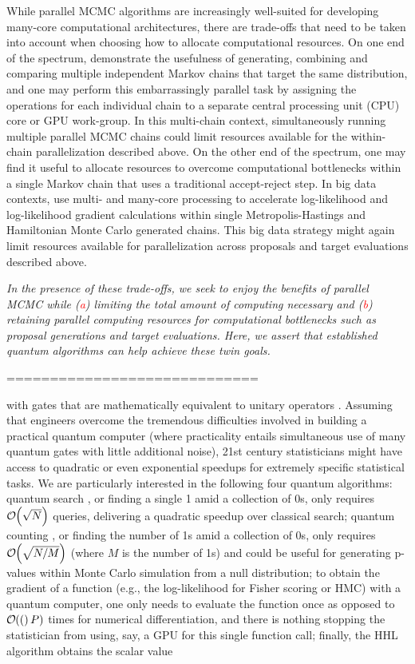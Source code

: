 \documentclass[12pt]{article} %
\newcommand{\order}[1]{{\cal O}\hspace{-0.2em}\left( #1 \right)}
\begin{document}
While parallel MCMC algorithms are increasingly well-suited for developing many-core computational architectures, there are trade-offs that need to be taken into account when choosing how to allocate computational resources.  On one end of the spectrum, \citet{gelman1992inference} demonstrate the usefulness of generating, combining and comparing multiple independent Markov chains that target the same distribution, and one may perform this embarrassingly parallel task by assigning the operations for each individual chain to a separate central processing unit (CPU) core or GPU work-group.  In this multi-chain context, simultaneously running multiple parallel MCMC chains could limit resources available for the within-chain parallelization described above.  On the other end of the spectrum, one may find it useful to allocate resources to overcome computational bottlenecks within a single Markov chain that uses a traditional accept-reject step. In big data contexts, \citet{holbrook2021viral,massive,holbrook2021scalable} use multi- and many-core processing to accelerate log-likelihood and log-likelihood gradient calculations within single Metropolis-Hastings and Hamiltonian Monte Carlo \citep{neal2011mcmc} generated chains.  This big data strategy might again limit resources available for parallelization across proposals and target evaluations described above.

\emph{In the presence of these trade-offs, we seek to enjoy the benefits of parallel MCMC while (\textcolor{red}{a}) limiting the total amount of computing necessary and (\textcolor{red}{b})  retaining parallel computing resources for computational bottlenecks such as proposal generations and target evaluations. Here, we assert that established quantum algorithms can help achieve these twin goals.}

=============================

with gates that are mathematically equivalent to unitary operators \citep{nielsen2002quantum}.  Assuming that engineers overcome the tremendous difficulties involved in building a practical quantum computer (where practicality entails simultaneous use of many quantum gates with little additional noise), 21st century statisticians might have access to quadratic or even exponential speedups for extremely specific statistical tasks.  We are particularly interested in the following four quantum algorithms: quantum search \citep{grover1996fast}, or finding a single 1 amid a collection of 0s, only requires $\order{\sqrt{N}}$ queries, delivering a quadratic speedup over classical search; quantum counting \citep{boyer1998tight}, or finding the number of 1s amid a collection of 0s, only requires $\order{\sqrt{N/M}}$ (where $M$ is the number of 1s) and could be useful for generating p-values within Monte Carlo simulation from a null distribution; to obtain the gradient of a function (e.g., the log-likelihood for Fisher scoring or HMC) with a quantum computer, one only needs to evaluate the function once \citep{jordan2005fast} as opposed to $\order(P)$ times for numerical differentiation, and there is nothing stopping the statistician from using, say, a GPU for this single function call; finally, the HHL algorithm \citep{harrow2009quantum} obtains the scalar value 
\end{document}
